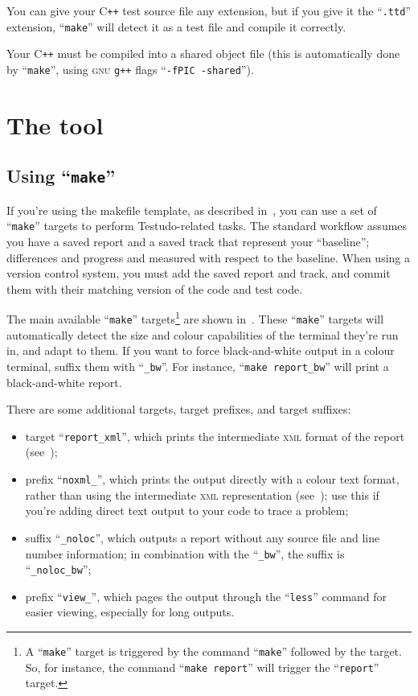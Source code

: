 \documentclass[twoside, a4paper, article]{memoir}
\newcommand*\Cpp{C\texttt{++}}
\begin{document}
You can give your \Cpp{} test source file any extension, but if you give it the
``\texttt{.ttd}'' extension, ``\texttt{make}'' will detect it as a test file
and compile it correctly.

Your \Cpp{} must be compiled into a shared object file (this is automatically
done by ``\texttt{make}'', using \textsc{gnu} \texttt{g++} flags
``\texttt{-fPIC -shared}'').

\section{The tool}

\subsection{Using ``\texttt{make}''}
\label{sec:using-make}

If you're using the makefile template, as described
in~, you can use a set of ``\texttt{make}'' targets
to perform Testudo-related tasks.  The standard workflow assumes you have a
saved report and a saved track that represent your ``baseline''; differences
and progress and measured with respect to the baseline.  When using a version
control system, you must add the saved report and track, and commit them with
their matching version of the code and test code.

The main available ``\texttt{make}'' targets\footnote{A ``\texttt{make}''
  target is triggered by the command ``\texttt{make}'' followed by the target.
  So, for instance, the command ``\texttt{make report}'' will trigger the
  ``\texttt{report}'' target.} are shown in~.
These ``\texttt{make}'' targets will automatically detect the size and colour
capabilities of the terminal they're run in, and adapt to them.  If you want to
force black-and-white output in a colour terminal, suffix them with
``\texttt{\_bw}''.  For instance, ``\texttt{make report\_bw}'' will print a
black-and-white report.

There are some additional targets, target prefixes, and target suffixes:
\begin{itemize}
\item target ``\texttt{report\_xml}'', which prints the intermediate
  \textsc{xml} format of the report (see~);
\item prefix ``\texttt{noxml\_}'', which prints the output directly with a
  colour text format, rather than using the intermediate \textsc{xml}
  representation (see~); use this if you're
  adding direct text output to your code to trace a problem;
\item suffix ``\texttt{\_noloc}'', which outputs a report without any source
  file and line number information; in combination with the
  ``\texttt{\_bw}'', the suffix is ``\texttt{\_noloc\_bw}'';
\item prefix ``\texttt{view\_}'', which pages the output through the
  ``\texttt{less}'' command for easier viewing, especially for long outputs.
\end{itemize}
\end{document}
